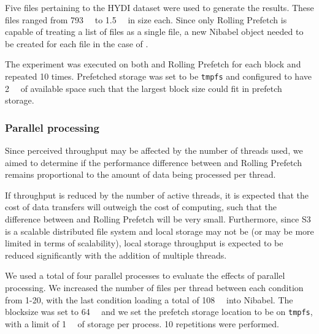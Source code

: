 Five files pertaining to the HYDI dataset were used to generate the results.
These files ranged from \SI{793}{\mebi\byte} to \SI{1.5}{\gibi\byte} in size
each. Since only Rolling Prefetch is capable of treating a list of files as a
single file, a new Nibabel object needed to be created for each file in the case
of \sfs.

The experiment was executed on both \sfs and Rolling Prefetch for each block and
repeated 10 times. Prefetched storage was set to be \texttt{tmpfs} and
configured to have \SI{2}{\gibi\byte} of available space such that the largest
block size could fit in prefetch storage.

\subsubsection{Parallel processing}\label{exp:parallel}

Since perceived throughput may be affected by the number of threads used, we
aimed to determine if the performance difference between \sfs and Rolling
Prefetch remains proportional to the amount of data being processed per thread. 

If throughput is reduced by the number of active threads, it is expected that
the cost of data transfers will outweigh the cost of computing, such that the
difference between \sfs and Rolling Prefetch will be very small. Furthermore,
since S3 is a scalable distributed file system and local storage may not be (or
may be more limited in terms of scalability), local storage throughput is
expected to be reduced significantly with the addition of multiple threads. 

We used a total of four parallel processes to evaluate the effects of parallel
processing. We increased the number of files per thread between each condition
from 1-20, with the last condition loading a total of \SI{108}{\gibi\byte} into
Nibabel. The blocksize was set to \SI{64}{\mebi\byte} and we set the prefetch
storage location to be on \texttt{tmpfs}, with a limit of \SI{1}{\gibi\byte} of
storage per process. 10 repetitions were performed.

